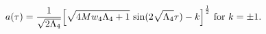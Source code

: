 \begin{equation}
 a(\tau)  = {1\over\sqrt{2\Lambda_4}}\Big[
{\sqrt{4Mw_4{\Lambda_4}+1}
~{\rm sin}(2\sqrt{\Lambda_4}\tau) - k}\Big]^{1\over2} 
~{\rm for} ~k = \pm 1.
\label{solthree_b}
\end{equation}

